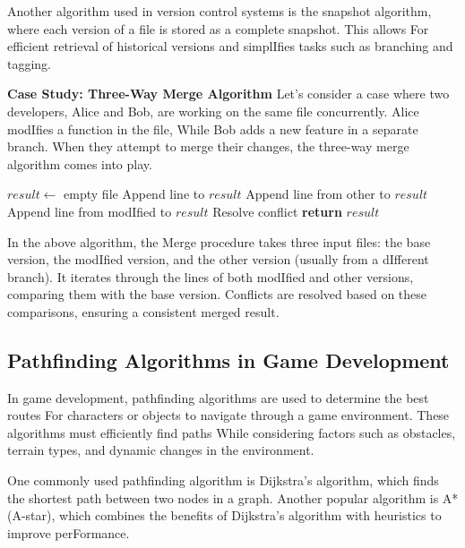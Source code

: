 \documentclass[12pt]{book} %
\begin{document}
Another algorithm used in version control systems is the snapshot algorithm, where each version of a file is stored as a complete snapshot. This allows For efficient retrieval of historical versions and simplIfies tasks such as branching and tagging.

\textbf{Case Study: Three-Way Merge Algorithm}
Let's consider a case where two developers, Alice and Bob, are working on the same file concurrently. Alice modIfies a function in the file, While Bob adds a new feature in a separate branch. When they attempt to merge their changes, the three-way merge algorithm comes into play.

\FloatBarrier
\begin{algorithm}
\caption{Three-Way Merge Algorithm}
\begin{algorithmic}[1]
    \State $result \gets$ empty file
            \State Append line to $result$
            \State Append line from other to $result$
            \State Append line from modIfied to $result$
        \Else
            \State Resolve conflict
        \EndIf
    \EndWhile
    \State \textbf{return} $result$
\EndProcedure
\end{algorithmic}
\end{algorithm}
\FloatBarrier

In the above algorithm, the Merge procedure takes three input files: the base version, the modIfied version, and the other version (usually from a dIfferent branch). It iterates through the lines of both modIfied and other versions, comparing them with the base version. Conflicts are resolved based on these comparisons, ensuring a consistent merged result.

\subsection{Pathfinding Algorithms in Game Development}
In game development, pathfinding algorithms are used to determine the best routes For characters or objects to navigate through a game environment. These algorithms must efficiently find paths While considering factors such as obstacles, terrain types, and dynamic changes in the environment.

One commonly used pathfinding algorithm is Dijkstra's algorithm, which finds the shortest path between two nodes in a graph. Another popular algorithm is A* (A-star), which combines the benefits of Dijkstra's algorithm with heuristics to improve perFormance.
\end{document}
